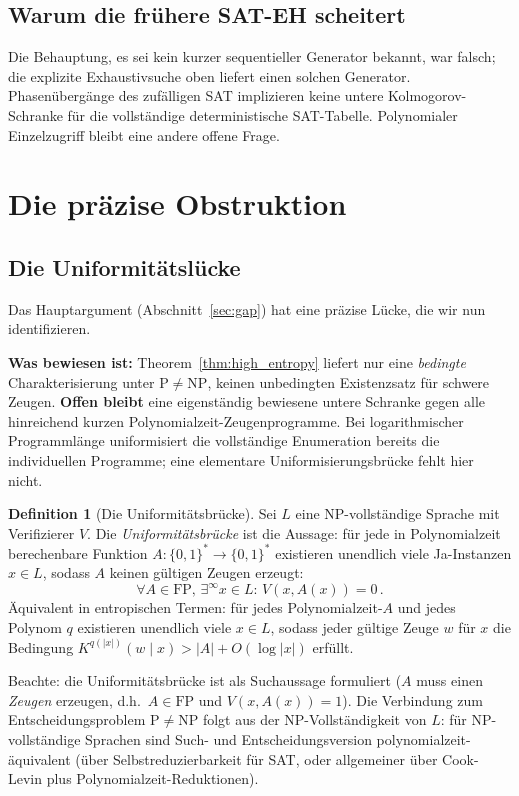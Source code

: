 \documentclass[aps,prd,twocolumn,superscriptaddress,nofootinbib]{revtex4-2}
\theoremstyle{definition}
\newtheorem{definition}[theorem]{Definition}
\theoremstyle{remark}
\newcommand{\NP}{\mathrm{NP}}
\newcommand{\PP}{\mathrm{P}}
\begin{document}
\subsection{Warum die frühere SAT-EH scheitert}
Die Behauptung, es sei kein kurzer sequentieller Generator bekannt,
war falsch; die explizite Exhaustivsuche oben liefert
einen solchen Generator. Phasenübergänge des zufälligen SAT implizieren
keine untere Kolmogorov-Schranke für die vollständige deterministische
SAT-Tabelle. Polynomialer Einzelzugriff bleibt eine andere offene Frage.

\section{Die präzise Obstruktion}
\label{sec:obstruction}

\subsection{Die Uniformitätslücke}

Das Hauptargument (Abschnitt~\ref{sec:gap}) hat eine präzise Lücke, die wir nun identifizieren.

\textbf{Was bewiesen ist:} Theorem~\ref{thm:high_entropy}
liefert nur eine \emph{bedingte} Charakterisierung unter
$\PP\ne\NP$, keinen unbedingten Existenzsatz für schwere Zeugen.
\textbf{Offen bleibt} eine eigenständig bewiesene untere Schranke
gegen alle hinreichend kurzen Polynomialzeit-Zeugenprogramme.
Bei logarithmischer Programmlänge uniformisiert die vollständige
Enumeration bereits die individuellen Programme; eine elementare
Uniformisierungsbrücke fehlt hier nicht.

\begin{definition}[Die Uniformitätsbrücke]
\label{def:uniformity}
Sei $L$ eine NP-vollständige Sprache mit Verifizierer $V$. Die \textit{Uniformitätsbrücke} ist die Aussage: für jede in Polynomialzeit berechenbare Funktion $A: \{0,1\}^* \to \{0,1\}^*$ existieren unendlich viele Ja-Instanzen $x \in L$, sodass $A$ keinen gültigen Zeugen erzeugt:
\begin{equation}
\forall A \in \mathrm{FP},\, \exists^\infty x \in L:\, V(x, A(x)) = 0\,.
\end{equation}
Äquivalent in entropischen Termen: für jedes Polynomialzeit-$A$ und jedes Polynom $q$ existieren unendlich viele $x \in L$, sodass jeder gültige Zeuge $w$ für $x$ die Bedingung $K^{q(|x|)}(w \mid x) > |A| + O(\log|x|)$ erfüllt.

Beachte: die Uniformitätsbrücke ist als Suchaussage formuliert ($A$ muss einen \textit{Zeugen} erzeugen, d.h.\ $A \in \mathrm{FP}$ und $V(x, A(x)) = 1$). Die Verbindung zum Entscheidungsproblem $\PP \neq \NP$ folgt aus der NP-Vollständigkeit von $L$: für NP-vollständige Sprachen sind Such- und Entscheidungsversion polynomialzeit-äquivalent (über Selbstreduzierbarkeit für SAT, oder allgemeiner über Cook-Levin plus Polynomialzeit-Reduktionen).
\end{definition}
\end{document}

